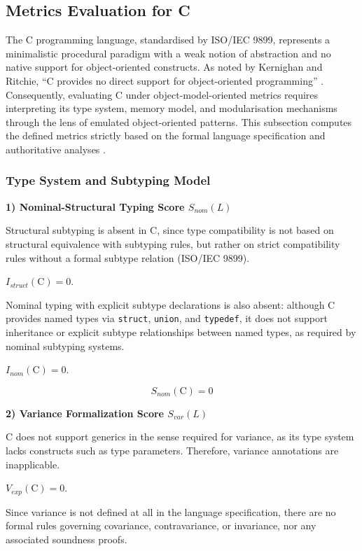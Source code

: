 \subsection{Metrics Evaluation for C}

The C programming language, standardised by ISO/IEC 9899, represents a minimalistic procedural paradigm with a weak notion of abstraction and no native support for object-oriented constructs. As noted by Kernighan and Ritchie, “C provides no direct support for object-oriented programming” \cite{ritchie1978c}. Consequently, evaluating C under object-model-oriented metrics requires interpreting its type system, memory model, and modularisation mechanisms through the lens of emulated object-oriented patterns. This subsection computes the defined metrics strictly based on the formal language specification and authoritative analyses \cite{iso9899_2024, pierce2002types}.

\subsubsection{Type System and Subtyping Model}

\textbf{1) Nominal-Structural Typing Score $S_{nom}(L)$}

Structural subtyping is absent in C, since type compatibility is not based on structural equivalence with subtyping rules, but rather on strict compatibility rules without a formal subtype relation (ISO/IEC 9899).

$I_{struct}(\text{C})=0$. 

Nominal typing with explicit subtype declarations is also absent: although C provides named types via \texttt{struct}, \texttt{union}, and \texttt{typedef}, it does not support inheritance or explicit subtype relationships between named types, as required by nominal subtyping systems.

$I_{nom}(\text{C})=0$.

\[
    S_{nom}(\text{C}) = 0
\]

\textbf{2) Variance Formalization Score $S_{var}(L)$}

C does not support generics in the sense required for variance, as its type system lacks constructs such as type parameters. Therefore, variance annotations are inapplicable.

$V_{exp}(\text{C})=0$. 

Since variance is not defined at all in the language specification, there are no formal rules governing covariance, contravariance, or invariance, nor any associated soundness proofs.

